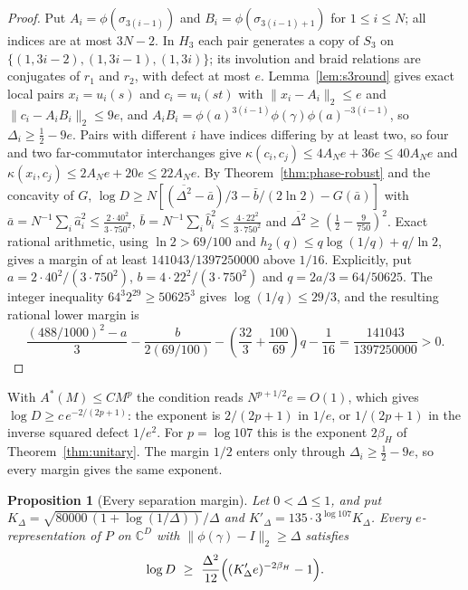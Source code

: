 \documentclass[11pt,a4paper]{article}
\theoremstyle{plain}
\newtheorem{proposition}[theorem]{Proposition}
\theoremstyle{definition}
\theoremstyle{remark}
\begin{document}
\begin{proof}
Put $A_i=\phi(\sigma_{3(i-1)})$ and $B_i=\phi(\sigma_{3(i-1)+1})$ for $1\le i\le N$; all indices are at most $3N-2$. In $H_3$ each pair
generates a copy of $S_3$ on $\{(1,3i-2),(1,3i-1),(1,3i)\}$; its involution and braid relations are conjugates of $r_1$ and $r_2$, with
defect at most $e$. Lemma~\ref{lem:s3round} gives exact local pairs $x_i=u_i(s)$ and $c_i=u_i(st)$ with $\|x_i-A_i\|_2\le e$ and
$\|c_i-A_iB_i\|_2\le9e$, and $A_iB_i=\phi(a)^{3(i-1)}\phi(\gamma)\phi(a)^{-3(i-1)}$, so $\Delta_i\ge\frac12-9e$. Pairs with different $i$ have
indices differing by at least two, so four and two far-commutator interchanges give $\kappa(c_i,c_j)\le4A_Ne+36e\le40A_Ne$ and
$\kappa(x_i,c_j)\le2A_Ne+20e\le22A_Ne$. By Theorem~\ref{thm:phase-robust} and the concavity of $G$,
$\log D\ge N[(\overline{\Delta^2}-\bar a)/3-\bar b/(2\ln2)-G(\bar a)]$ with $\bar a=N^{-1}\sum_i\hat a_i^2\le\frac{2\cdot40^2}{3\cdot750^2}$,
$\bar b=N^{-1}\sum_i\hat b_i^2\le\frac{4\cdot22^2}{3\cdot750^2}$ and $\overline{\Delta^2}\ge(\frac12-\frac9{750})^2$. Exact rational arithmetic, using
$\ln2>69/100$ and $h_2(q)\le q\log(1/q)+q/\ln2$, gives a margin of at least $141043/1397250000$ above $1/16$.
Explicitly, put $a=2\cdot40^2/(3\cdot750^2)$, $b=4\cdot22^2/(3\cdot750^2)$ and $q=2a/3=64/50625$.
The integer inequality $64^3 2^{29}\ge50625^3$ gives $\log(1/q)\le29/3$, and the resulting rational lower margin is
\[
\frac{(488/1000)^2-a}{3}-\frac{b}{2(69/100)}
-\left(\frac{32}{3}+\frac{100}{69}\right)q-\frac1{16}
=\frac{141043}{1397250000}>0.
\]
\end{proof}

With $A^*(M)\le CM^p$ the condition reads $N^{p+1/2}e=O(1)$, which gives $\log D\ge c\,e^{-2/(2p+1)}$: the exponent is $2/(2p+1)$ in
$1/e$, or $1/(2p+1)$ in the inverse squared defect $1/e^2$. For $p=\log107$ this is the exponent $2\beta_H$ of Theorem~\ref{thm:unitary}. The margin
$1/2$ enters only through $\Delta_i\ge\frac12-9e$, so every margin gives the same exponent.

\begin{proposition}[Every separation margin]\label{prop:margin}
Let $0<\Delta\le1$, and put $K_\Delta=\sqrt{80000\,(1+\log(1/\Delta))}/\Delta$ and
$K'_\Delta=135\cdot3^{\log107}K_\Delta$. Every $e$-representation of $P$ on $\mathbb C^D$ with $\|\phi(\gamma)-I\|_2\ge\Delta$ satisfies
\[
\log D\ \ge\ \frac{\Delta^2}{12}\Bigl((K'_\Delta e)^{-2\beta_H}-1\Bigr).
\]
\end{proposition}
\end{document}
